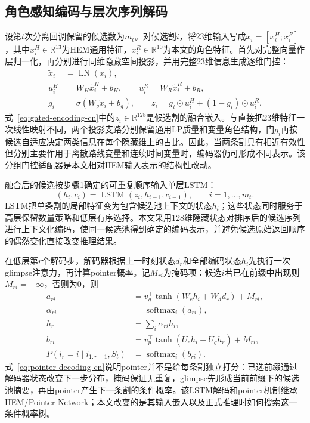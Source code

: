 \documentclass[final,5p,times,twocolumn]{elsarticle}
\begin{document}
\subsection{角色感知编码与层次序列解码}

设第$t$次分离回调保留的候选数为$m_t$。对候选割$i$，将23维输入写成$x_i=[x_i^{H};x_i^{R}]$，其中$x_i^{H}\in\mathbb R^{13}$为HEM通用特征，$x_i^{R}\in\mathbb R^{10}$为本文的角色特征。首先对完整向量作层归一化，再分别进行同维隐藏空间投影，并用完整23维信息生成逐维门控：
\begin{equation}
\begin{aligned}
\widetilde x_i&=\operatorname{LN}(x_i),\\
u_i^{H}&=W_H\widetilde x_i^{H}+b_H,\qquad
u_i^{R}=W_R\widetilde x_i^{R}+b_R,\\
g_i&=\sigma(W_g\widetilde x_i+b_g),\qquad
z_i=g_i\odot u_i^{H}+(1-g_i)\odot u_i^{R}.
\end{aligned}
\label{eq:gated-encoding-cn}
\end{equation}
式~\eqref{eq:gated-encoding-cn}中的$z_i\in\mathbb R^{128}$是候选割的融合嵌入。与直接把23维特征一次线性映射不同，两个投影支路分别保留通用LP质量和变量角色结构，门$g_i$再按候选自适应决定两类信息在每个隐藏维上的占比。因此，当两条割具有相近有效性但分别主要作用于离散路线变量和连续时间变量时，编码器仍可形成不同表示。该分组门控适配器是本文相对HEM输入表示的结构性改动。

融合后的候选按步骤1确定的可重复顺序输入单层LSTM：
\begin{equation}
(h_i,c_i)=\operatorname{LSTM}(z_i,h_{i-1},c_{i-1}),\qquad i=1,\ldots,m_t .
\label{eq:lstm-encoding-cn}
\end{equation}
LSTM把单条割的局部特征变为包含候选池上下文的状态$h_i$；这些状态同时服务于高层保留数量策略和低层有序选择。本文采用128维隐藏状态对排序后的候选序列进行上下文化编码，使同一候选池得到确定的编码表示，并避免候选原始返回顺序的偶然变化直接改变推理结果。

在低层第$r$个解码步，解码器根据上一时刻状态$d_r$和全部编码状态$h_i$先执行一次glimpse注意力，再计算pointer概率。记$M_{ri}$为掩码项：候选$i$若已在前缀中出现则$M_{ri}=-\infty$，否则为0，则
\begin{equation}
\begin{aligned}
a_{ri}&=v_g^\top\tanh(W_e h_i+W_d d_r)+M_{ri},\\
\alpha_{ri}&=\operatorname{softmax}_i(a_{ri}),\\
\bar h_r&=\sum_i\alpha_{ri}h_i,\\
b_{ri}&=v_p^\top\tanh(U_e h_i+U_g\bar h_r)+M_{ri},\\
P(i_r=i\mid i_{1:r-1},S_t)&=\operatorname{softmax}_i(b_{ri}).
\end{aligned}
\label{eq:pointer-decoding-cn}
\end{equation}
式~\eqref{eq:pointer-decoding-cn}说明pointer并不是给每条割独立打分：已选前缀通过解码器状态改变下一步分布，掩码保证无重复，glimpse先形成当前前缀下的候选池摘要，再由pointer产生下一条割的条件概率。该LSTM解码和pointer机制继承HEM/Pointer Network；本文改变的是其输入嵌入以及正式推理时如何搜索这一条件概率树。
\end{document}
